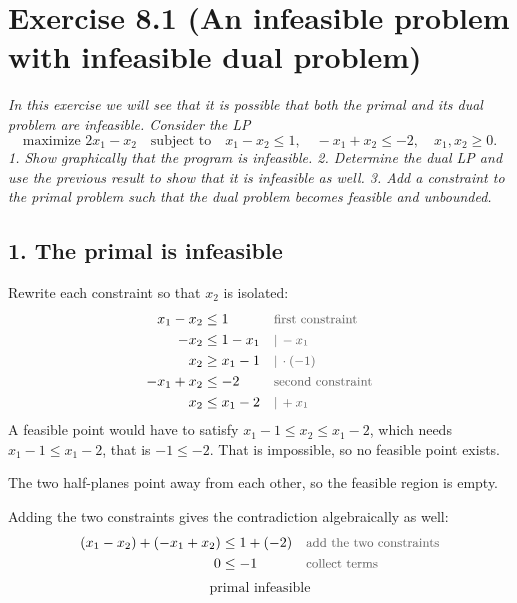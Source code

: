 \documentclass[a4paper,11pt]{article}
\newif\ifexplain
\newcommand{\aufgabe}[1]{\section*{#1}}
\newcommand{\angabe}[1]{\textit{#1}\par\smallskip}
\newcommand{\teil}[1]{\subsection*{#1}}
\newcommand{\why}[1]{\text{\small\color{black!65}#1}}
\newcommand{\explain}[1]{\ifexplain\begin{erklbox}#1\end{erklbox}\fi}
\begin{document}
\aufgabe{Exercise 8.1 (An infeasible problem with infeasible dual problem)}
\angabe{In this exercise we will see that it is possible that both the primal and its dual problem are infeasible. Consider the LP
\[
\text{maximize } 2x_1 - x_2 \quad\text{subject to}\quad x_1 - x_2 \le 1,\quad -x_1 + x_2 \le -2,\quad x_1, x_2 \ge 0.
\]
1. Show graphically that the program is infeasible. 2. Determine the dual LP and use the previous result to show that it is infeasible as well. 3. Add a constraint to the primal problem such that the dual problem becomes feasible and unbounded.}

\teil{1. The primal is infeasible}
Rewrite each constraint so that $x_2$ is isolated:
\begin{align*}
x_1 - x_2 &\le 1 && \why{first constraint}\\
-x_2 &\le 1 - x_1 && \why{$|\,-x_1$}\\
x_2 &\ge x_1 - 1 && \why{$|\,\cdot(-1)$}\\
-x_1 + x_2 &\le -2 && \why{second constraint}\\
x_2 &\le x_1 - 2 && \why{$|\,+x_1$}
\end{align*}
A feasible point would have to satisfy $x_1 - 1 \le x_2 \le x_1 - 2$, which needs $x_1 - 1 \le x_1 - 2$, that is $-1 \le -2$. That is impossible, so no feasible point exists.
\explain{Beide Grenzen sind Geraden mit Steigung $1$, also parallel. Die erste Nebenbedingung verlangt den Bereich oberhalb der Geraden $x_2=x_1-1$, die zweite den Bereich unterhalb der Geraden $x_2=x_1-2$. Die Gerade $x_2=x_1-1$ liegt immer über der Geraden $x_2=x_1-2$, deshalb überschneiden sich die beiden Halbebenen nirgends. Die Nichtnegativität $x_1,x_2\ge0$ macht das nicht besser: Der Widerspruch entsteht schon allein aus den beiden Ungleichungen.}
\begin{center}
\end{center}
The two half-planes point away from each other, so the feasible region is empty.
\explain{Die rote Gerade ist $x_2=x_1-1$, die blaue $x_2=x_1-2$. Der rote Pfeil zeigt in die zulässige Richtung der ersten Nebenbedingung (nach oben, $x_2\ge x_1-1$), der blaue in die der zweiten (nach unten, $x_2\le x_1-2$). Beide Pfeile zeigen voneinander weg.}
Adding the two constraints gives the contradiction algebraically as well:
\begin{align*}
(x_1 - x_2) + (-x_1 + x_2) &\le 1 + (-2) && \why{add the two constraints}\\
0 &\le -1 && \why{collect terms}
\end{align*}
\[
\boxed{\text{primal infeasible}}
\]
\end{document}
